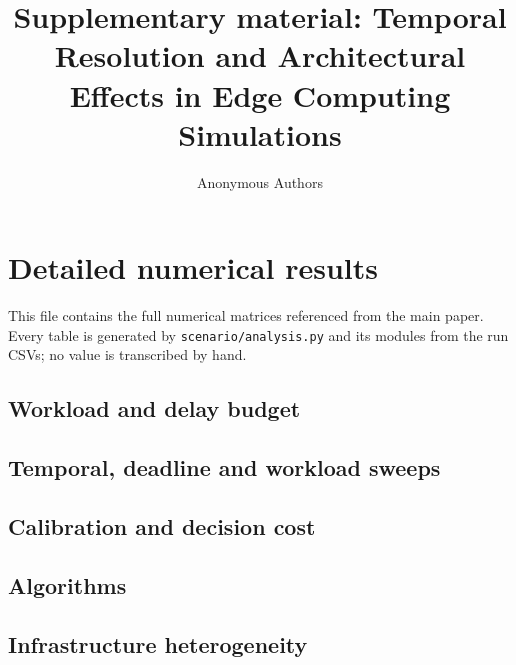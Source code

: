 \documentclass[journal,10pt]{IEEEtran}
\begin{document}
\title{Supplementary material: Temporal Resolution and Architectural Effects in
Edge Computing Simulations}
\author{Anonymous Authors}
\maketitle

\section{Detailed numerical results}

This file contains the full numerical matrices referenced from the main paper.
Every table is generated by \texttt{scenario/analysis.py} and its modules from
the run CSVs; no value is transcribed by hand.

\subsection{Workload and delay budget}



\subsection{Temporal, deadline and workload sweeps}




\subsection{Calibration and decision cost}




\subsection{Algorithms}





\subsection{Infrastructure heterogeneity}




\end{document}
